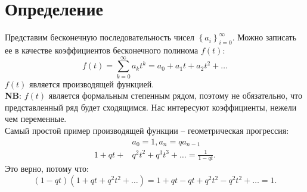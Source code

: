 \documentclass[a4paper,14pt]{article}
\begin{document}
\section*{Определение}
Представим бесконечную последовательность чисел $\left\{a_i\right\}_{i=0}^\infty$. Можно записать ее
в качестве коэффициентов бесконечного полинома $f(t)$:
\[
	f(t) = \sum_{k=0}^{\infty} a_kt^k = a_0 + a_1t + a_2t^2 + \ldots
\]
$f(t)$ является производящей функцией. \\
\textbf{NB}: $f(t)$ является формальным степенным рядом, поэтому не обязательно, что представленный
ряд будет сходящимся. Нас интересуют коэффициенты, нежели чем переменные. \\
Самый простой пример производящей функции – геометрическая прогрессия:
\begin{align*}
	&a_0 = 1, a_n = qa_{n-1} \\
	1 + qt + &q^2t^2 + q^3t^3 + \ldots = \frac{1}{1 - qt}
.\end{align*}
Это верно, потому что:
\[
	(1 - qt)(1 + qt + q^2t^2 + \ldots) = 1 + qt - qt + q^2t^2 - q^2t^2 + \ldots = 1.
\] 
\end{document}
